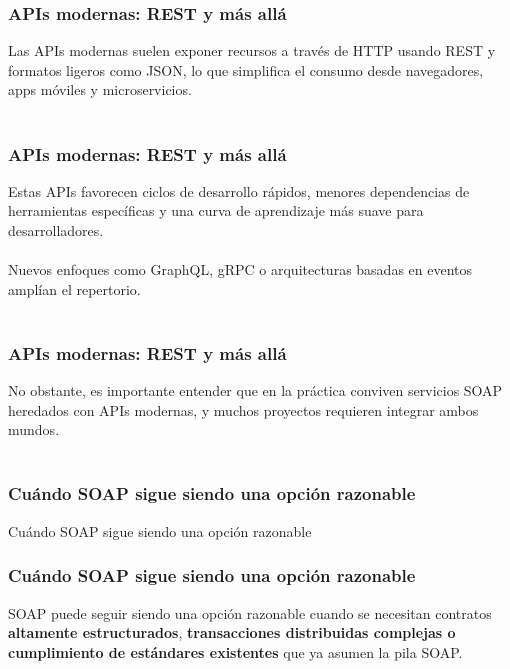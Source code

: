 \documentclass[t,24pt,aspectratio=169]{beamer}
\begin{document}
	\begin{frame}
		\frametitle{APIs modernas: REST y más allá}
			\vfill
Las APIs modernas suelen exponer recursos a través de HTTP usando REST y formatos ligeros como JSON, lo que simplifica el consumo desde navegadores, apps móviles y microservicios.
\\~\\
			\vfill
	\end{frame}


	\begin{frame}
		\frametitle{APIs modernas: REST y más allá}
			\vfill
Estas APIs favorecen ciclos de desarrollo rápidos, menores dependencias de herramientas específicas y una curva de aprendizaje más suave para desarrolladores.
\\~\\
Nuevos enfoques como GraphQL, gRPC o arquitecturas basadas en eventos amplían el repertorio.
\\~\\
			\vfill
	\end{frame}


	\begin{frame}
		\frametitle{APIs modernas: REST y más allá}
			\vfill
No obstante, es importante entender que en la práctica conviven servicios SOAP heredados con APIs modernas, y muchos proyectos requieren integrar ambos mundos.
\\~\\
			\vfill
	\end{frame}


	\begin{frame}
		\frametitle{Cuándo SOAP sigue siendo una opción razonable}
			\vfill
			\centering
			\Huge{Cuándo SOAP sigue siendo una opción razonable}
			\vfill
	\end{frame}


	\begin{frame}
		\frametitle{Cuándo SOAP sigue siendo una opción razonable}
			\vfill
SOAP puede seguir siendo una opción razonable cuando se necesitan contratos \textbf{altamente estructurados}, \textbf{transacciones distribuidas complejas o cumplimiento de estándares existentes} que ya asumen la pila SOAP.
\\~\\
			\vfill
	\end{frame}
\end{document}
